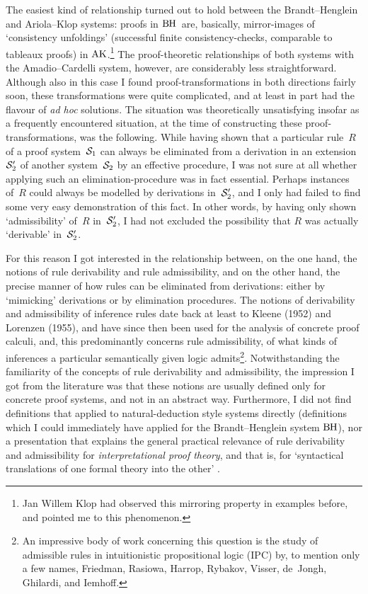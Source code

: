 \documentclass[envcountsame,runningheads]{llncs}
\newcommand{\AKeq}{$\text{A\hspace{-0.1pt}K}$} \newcommand{\ACeq}{$\text{A\hspace{-1.05pt}C}$} \newcommand{\BHeq}{$\text{B\hspace{-0.45pt}H}$}
\newcommand{\aprfsys}{{\cal S}}
\newcommand{\extd}[1]{{#1 '}}
\newcommand{\arule}{R}
\begin{document}
The easiest kind of relationship turned out to hold between the Brandt--Henglein 
and Ariola--Klop systems: proofs in \BHeq\ are, basically, mirror-images of 
`consistency unfoldings' (successful finite consistency-checks,
comparable to tableaux proofs) in \AKeq.\footnote{Jan Willem Klop had observed this mirroring property in examples
    before, and pointed me to this phenomenon.}
The proof-theoretic relationships of both systems with the Amadio--Cardelli system,
however, are considerably less straightforward. 
Although also in this case I found proof-transformations 
in both directions fairly soon, these transformations were quite complicated, 
and at least in part had the flavour of \emph{ad hoc} solutions.
The situation was theoretically unsatisfying insofar as a frequently
encountered situation, at the time of constructing these proof-transformations,
was the following.
While having shown that a particular rule~$\arule$ of a proof system~$\aprfsys_1$
can always be eliminated from a derivation in an extension~$\extd{\aprfsys_2}$
of another system~$\aprfsys_2$ by an effective procedure,
I was not sure at all whether applying such an elimination-procedure
was in fact essential. Perhaps instances of~$\arule$ could always
be modelled by derivations in~$\extd{\aprfsys_2}$,
and I only had failed to find some very easy demonstration of this fact.
In other words, by having only shown `admissibility' of~$\arule$ in~$\extd{\aprfsys_2}$,
I had not excluded the possibility that $\arule$ was actually `derivable'
in~$\extd{\aprfsys_2}$. 

For this reason I got interested in the relationship between, on the one hand,
the notions of rule derivability and rule admissibility,
and on the other hand, the precise manner of how rules can be eliminated
from derivations: either by `mimicking' derivations or by elimination procedures.
The notions of derivability and admissibility of inference rules date
back at least to Kleene \cite{klee:1952} (1952) and Lorenzen \cite{lore:1955} (1955),
and have since then been used for the analysis of concrete
proof calculi, and, this predominantly concerns rule admissibility, 
of what kinds of 
inferences a particular semantically given logic admits\footnote{An impressive body of work concerning this question is the study of
    admissible rules in intuitionistic propositional logic (IPC)
    by, to mention only a few names, Friedman, Rasiowa, Harrop, Rybakov, 
    Visser, de~Jongh, Ghilardi, and Iemhoff.}.
Notwithstanding the familiarity of the concepts of rule derivability and admissibility,
the impression I got from the literature was that
these notions are usually defined only for concrete proof systems, and not 
in an abstract way. Furthermore, I did not find definitions that
applied to natural-deduction style systems directly (definitions which
I could immediately have applied for the Brandt--Henglein system \BHeq),
nor a presentation that explains the general practical relevance
of rule derivability and admissibility for \emph{interpretational proof theory},
and that is, for `syntactical translations of one formal theory into the other'
\cite{troe:schw:2000}.
\end{document}
